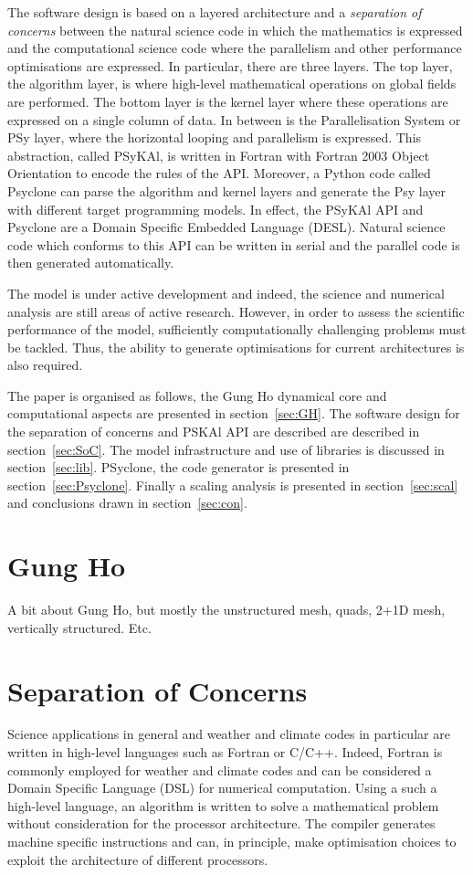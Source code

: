 \documentclass[times]{elsarticle}
\begin{document}
The software design is based on a layered architecture and a 
{\em separation of concerns} between the natural science code in which
the mathematics is expressed and the computational science code where the
parallelism and other performance optimisations are expressed. In particular,
there are three layers. The top layer, the algorithm layer, is where high-level mathematical 
operations on global fields are performed. The bottom layer is the kernel layer
where these operations are expressed on a single column of data. In between is the
Parallelisation System or PSy layer, where the horizontal looping and parallelism is
expressed. This abstraction, called PSyKAl, is written in Fortran with Fortran 2003
Object Orientation to encode the rules of the API.
Moreover, a Python code called Psyclone can parse the algorithm and kernel layers and
generate the Psy layer with different target programming models. In effect, the PSyKAl API
and Psyclone are a Domain Specific Embedded Language (DESL). Natural science code which
conforms to this API can be written in serial and the parallel code is then generated automatically.

The model is under active development and indeed, the science and
numerical analysis are still areas of active research. However, in
order to assess the scientific performance of the model, sufficiently
computationally challenging problems must be tackled. Thus, the
ability to generate optimisations for current architectures is also
required. 

The paper is organised as follows, the Gung Ho dynamical core and
computational aspects are presented in section~\ref{sec:GH}. The
software design for the separation of concerns and PSKAl API are described 
are described in section~\ref{sec:SoC}. The model infrastructure and
use of libraries is discussed in section~\ref{sec:lib}. PSyclone, the
code generator is presented in section~\ref{sec:Psyclone}. Finally a
scaling analysis is presented in section~\ref{sec:scal} and
conclusions drawn in section~\ref{sec:con}.

\section{\label{sec:GH}Gung Ho}
A bit about Gung Ho, but mostly the unstructured mesh, quads, 2+1D
mesh, vertically structured. Etc.

\section{\label{sec:SoC}Separation of Concerns}
Science applications in general and weather and climate codes in
particular are written in high-level languages such as Fortran or
C/C++. Indeed, Fortran is commonly employed for weather and climate
codes and can be considered a Domain Specific Language (DSL) for
numerical computation. Using a such a high-level language, an
algorithm is written to solve a mathematical problem without
consideration for the processor architecture. The compiler generates
machine specific instructions and can, in principle, make optimisation
choices to exploit the architecture of different processors.
\end{document}
